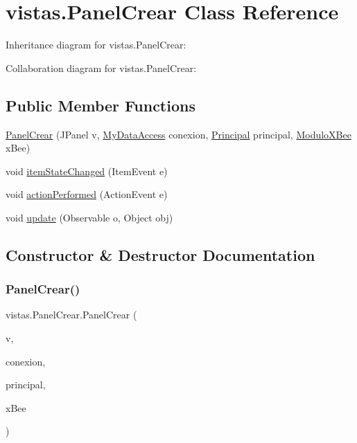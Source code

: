 \hypertarget{classvistas_1_1_panel_crear}{}\section{vistas.\+Panel\+Crear Class Reference}
\label{classvistas_1_1_panel_crear}


Inheritance diagram for vistas.\+Panel\+Crear\+:


Collaboration diagram for vistas.\+Panel\+Crear\+:
\subsection*{Public Member Functions}
\begin{DoxyCompactItemize}
\item 
\mbox{\hyperlink{classvistas_1_1_panel_crear_aa70ba36abb988733928cb8f23c920262}{Panel\+Crear}} (J\+Panel v, \mbox{\hyperlink{classconexion_s_q_l_1_1_my_data_access}{My\+Data\+Access}} conexion, \mbox{\hyperlink{classvistas_1_1_principal}{Principal}} principal, \mbox{\hyperlink{classcomunicacion_1_1_modulo_x_bee}{Modulo\+X\+Bee}} x\+Bee)
\item 
void \mbox{\hyperlink{classvistas_1_1_panel_crear_a668d00abf12ad5a3f53ba063c6cc8d39}{item\+State\+Changed}} (Item\+Event e)
\item 
void \mbox{\hyperlink{classvistas_1_1_panel_crear_af3bd29f72641be17636321ed461373d9}{action\+Performed}} (Action\+Event e)
\item 
void \mbox{\hyperlink{classvistas_1_1_panel_crear_acf3b138f0c0c67c48a405b469eb37606}{update}} (Observable o, Object obj)
\end{DoxyCompactItemize}


\subsection{Constructor \& Destructor Documentation}
\mbox{\label{classvistas_1_1_panel_crear_aa70ba36abb988733928cb8f23c920262}} 
\subsubsection{\texorpdfstring{Panel\+Crear()}{PanelCrear()}}
{\footnotesize\ttfamily vistas.\+Panel\+Crear.\+Panel\+Crear (\begin{DoxyParamCaption}\item[{J\+Panel}]{v,  }\item[{\mbox{\hyperlink{classconexion_s_q_l_1_1_my_data_access}{My\+Data\+Access}}}]{conexion,  }\item[{\mbox{\hyperlink{classvistas_1_1_principal}{Principal}}}]{principal,  }\item[{\mbox{\hyperlink{classcomunicacion_1_1_modulo_x_bee}{Modulo\+X\+Bee}}}]{x\+Bee }\end{DoxyParamCaption})\hspace{0.3cm}{\ttfamily [inline]}}

